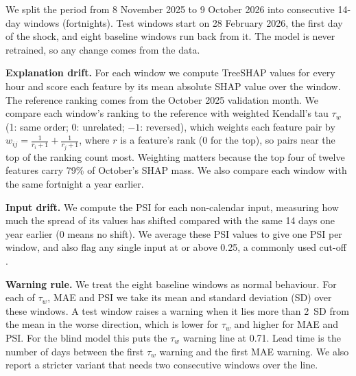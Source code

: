 
We split the period from 8 November 2025 to 9 October 2026 into
consecutive 14-day windows (fortnights). Test windows
start on 28 February 2026, the first day of the shock, and eight baseline
windows run back from it. The model is never retrained, so any change comes from the data.

\textbf{Explanation drift.} For each window we compute TreeSHAP values
\cite{lundberg2020} for every hour and score each feature by its mean
absolute SHAP value over the window. The reference ranking comes from the
October 2025 validation month. We compare each window's ranking to the
reference with weighted Kendall's tau $\tau_w$ \cite{kendall1938,vigna2015}
(1: same order; 0: unrelated; $-1$: reversed), which weights each
feature pair by $w_{ij} = \frac{1}{r_i+1} + \frac{1}{r_j+1}$, where $r$
is a feature's rank (0 for the top), so pairs near the top of the
ranking count most. Weighting matters because the top four of twelve
features carry 79\% of October's SHAP mass. We also compare each window with the same fortnight a year earlier.

\textbf{Input drift.} We compute the PSI \cite{yurdakul2018} for each
non-calendar input, measuring how much the
spread of its values has shifted compared with the same 14 days one year
earlier (0 means no shift). We average these PSI values to
give one PSI per window, and also flag any single input at or above
0.25, a commonly used cut-off \cite{yurdakul2018}.

\textbf{Warning rule.} We treat the eight baseline windows as normal
behaviour. For each of $\tau_w$, MAE and PSI we take its mean and
standard deviation (SD) over these windows. A test window raises a
warning when it lies more than 2~SD from the mean in the worse
direction, which is lower for $\tau_w$ and higher for MAE and PSI. For
the blind model this puts the $\tau_w$ warning line at 0.71. Lead time
is the number of days between the first $\tau_w$ warning and the first
MAE warning. We also report a stricter variant that needs two
consecutive windows over the line.